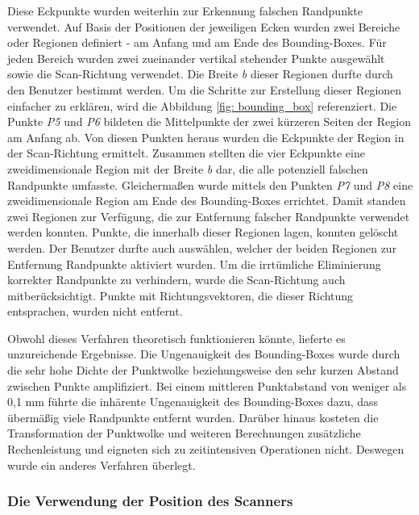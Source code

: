 Diese Eckpunkte wurden weiterhin zur Erkennung falschen Randpunkte verwendet. Auf Basis der Positionen der jeweiligen Ecken wurden zwei Bereiche oder Regionen definiert - am Anfang und am Ende des Bounding-Boxes. Für jeden Bereich wurden zwei zueinander vertikal stehender Punkte ausgewählt sowie die Scan-Richtung verwendet. Die Breite \textit{b} dieser Regionen durfte durch den Benutzer bestimmt werden. Um die Schritte zur Erstellung dieser Regionen einfacher zu erklären, wird die Abbildung \ref{fig: bounding_box} referenziert. Die Punkte \textit{P5} und \textit{P6} bildeten die Mittelpunkte der zwei kürzeren Seiten der Region am Anfang ab. Von diesen Punkten heraus wurden die Eckpunkte der Region in der Scan-Richtung ermittelt. Zusammen stellten die vier Eckpunkte eine zweidimensionale Region mit der Breite \textit{b} dar, die alle potenziell falschen Randpunkte umfasste. Gleichermaßen wurde mittels den Punkten \textit{P7} und \textit{P8} eine zweidimensionale Region am Ende des Bounding-Boxes errichtet. Damit standen zwei Regionen zur Verfügung, die zur Entfernung falscher Randpunkte verwendet werden konnten. Punkte, die innerhalb dieser Regionen lagen, konnten gelöscht werden. Der Benutzer durfte auch auswählen, welcher der beiden Regionen zur Entfernung Randpunkte aktiviert wurden. Um die irrtümliche Eliminierung korrekter Randpunkte zu verhindern, wurde die Scan-Richtung auch mitberücksichtigt. Punkte mit Richtungsvektoren, die dieser Richtung entsprachen, wurden nicht entfernt. 

Obwohl dieses Verfahren theoretisch funktionieren könnte, lieferte es unzureichende Ergebnisse. Die Ungenauigkeit des Bounding-Boxes wurde durch die sehr hohe Dichte der Punktwolke beziehungsweise den sehr kurzen Abstand zwischen Punkte amplifiziert. Bei einem mittleren Punktabstand von weniger als 0,1 mm führte die inhärente Ungenauigkeit des Bounding-Boxes dazu, dass übermäßig viele Randpunkte entfernt wurden. Darüber hinaus kosteten die Transformation der Punktwolke und weiteren Berechnungen zusätzliche Rechenleistung und eigneten sich zu zeitintensiven Operationen nicht. Deswegen wurde ein anderes Verfahren überlegt.

\subsubsection{Die Verwendung der Position des Scanners}
